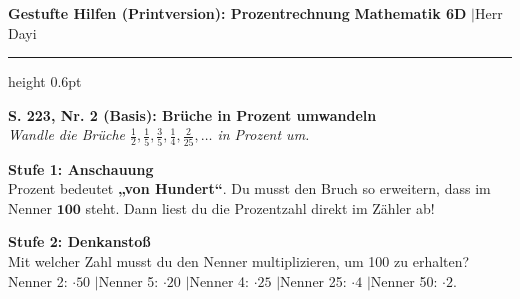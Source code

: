 \documentclass[a4paper,10pt]{article}
\begin{document}

\noindent
{\color{primaryBlue}\bfseries\normalsize \faBook\enskip Gestufte Hilfen (Printversion): Prozentrechnung}
\hfill
{\footnotesize\color{primaryBlue!80} \textbf{Mathematik 6D} \quad$|$\quad Herr Dayi}
\vspace{1.5mm}
{\color{primaryBlue!40}\hrule height 0.6pt}
\vspace{2.5mm}

\begin{tcolorbox}[enhanced, colback=lvlGreen!5, colframe=lvlGreen!50, arc=2mm, boxrule=0.8pt, left=3mm, right=3mm, top=2mm, bottom=2mm]
    {\bfseries\color{lvlGreen} \faStar\enskip S. 223, Nr. 2 (Basis): Brüche in Prozent umwandeln}\\[1mm]
    {\footnotesize\textit{Wandle die Brüche $\frac{1}{2}, \frac{1}{5}, \frac{3}{5}, \frac{1}{4}, \frac{2}{25}, \dots$ in Prozent um.}}
\end{tcolorbox}

\vspace{1.5mm}

\begin{tcolorbox}[colback=step1Bg, colframe=step1Border, arc=1.8mm, boxrule=0.7pt, left=3mm, right=3mm, top=1.8mm, bottom=1.8mm]
    {\color{step1Text}\small\bfseries\faEye\enskip Stufe 1: Anschauung}\\[1mm]
    {\footnotesize Prozent bedeutet \textbf{„von Hundert“}. Du musst den Bruch so erweitern, dass im Nenner $\mathbf{100}$ steht. Dann liest du die Prozentzahl direkt im Zähler ab!}
\end{tcolorbox}

\begin{tcolorbox}[colback=step2Bg, colframe=step2Border, arc=1.8mm, boxrule=0.7pt, left=3mm, right=3mm, top=1.8mm, bottom=1.8mm]
    {\color{step2Text}\small\bfseries\faLightbulb\enskip Stufe 2: Denkanstoß}\\[1mm]
    {\footnotesize Mit welcher Zahl musst du den Nenner multiplizieren, um 100 zu erhalten?\\
    Nenner 2: $\cdot 50$ \quad$|$\quad Nenner 5: $\cdot 20$ \quad$|$\quad Nenner 4: $\cdot 25$ \quad$|$\quad Nenner 25: $\cdot 4$ \quad$|$\quad Nenner 50: $\cdot 2$.}
\end{tcolorbox}
\end{document}
